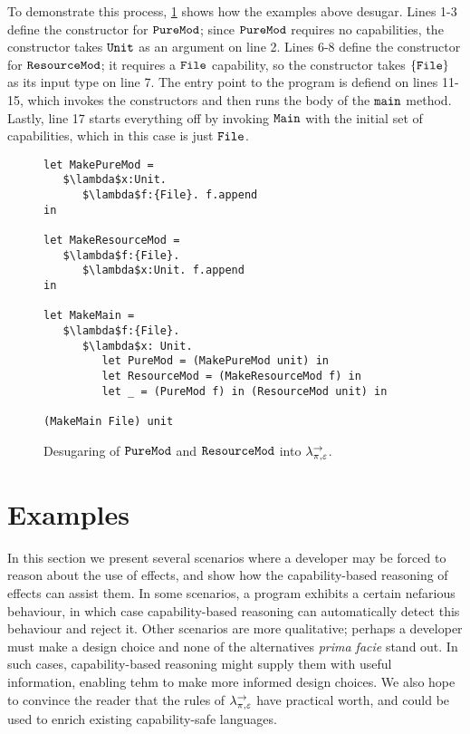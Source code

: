 To demonstrate this process, \ref{fig:wyv_tutorial_desugaring} shows how the examples above desugar. Lines 1-3 define the constructor for $\mathtt{PureMod}$; since $\mathtt{PureMod}$ requires no capabilities, the constructor takes $\mathtt{Unit}$ as an argument on line 2. Lines 6-8 define the constructor for $\mathtt{ResourceMod}$; it requires a $\mathtt{File}$ capability, so the constructor takes $\mathtt{\{File\}}$ as its input type on line 7. The entry point to the program is defiend on lines 11-15, which invokes the constructors and then runs the body of the $\mathtt{main}$ method. Lastly, line 17 starts everything off by invoking $\mathtt{Main}$ with the initial set of capabilities, which in this case is just $\mathtt{File}$.

\begin{figure}[h]

\begin{lstlisting}
let MakePureMod =
   $\lambda$x:Unit.
      $\lambda$f:{File}. f.append
in

let MakeResourceMod =
   $\lambda$f:{File}.
      $\lambda$x:Unit. f.append
in

let MakeMain =
   $\lambda$f:{File}.
      $\lambda$x: Unit.
         let PureMod = (MakePureMod unit) in
         let ResourceMod = (MakeResourceMod f) in
         let _ = (PureMod f) in (ResourceMod unit) in

(MakeMain File) unit
\end{lstlisting}

\caption{Desugaring of $\mathtt{PureMod}$ and $\mathtt{ResourceMod}$ into $\lambda^{\rightarrow}_{\pi, \varepsilon}$.}
\label{fig:wyv_tutorial_desugaring}
\end{figure}




\section{Examples}

In this section we present several scenarios where a developer may be forced to reason about the use of effects, and show how the capability-based reasoning of effects can assist them. In some scenarios, a program exhibits a certain nefarious behaviour, in which case capability-based reasoning can automatically detect this behaviour and reject it. Other scenarios are more qualitative; perhaps a developer must make a design choice and none of the alternatives \textit{prima facie} stand out. In such cases, capability-based reasoning might supply them with useful information, enabling tehm to make more informed design choices. We also hope to convince the reader that the rules of $\lambda^{\rightarrow}_{\pi, \varepsilon}$ have practical worth, and could be used to enrich existing capability-safe languages.

